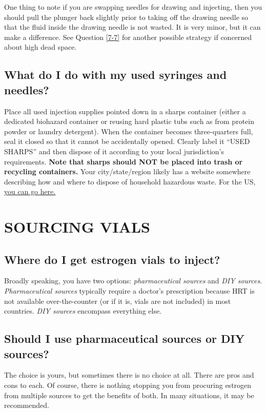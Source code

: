 \documentclass{article}
\begin{document}
One thing to note if you are swapping needles for drawing and injecting, then you should pull the plunger back slightly prior to taking off the drawing needle so that the fluid inside the drawing needle is not wasted. It is very minor, but it can make a difference. See Question \ref{7-7} for another possible strategy if concerned about high dead space.

\subsection{What do I do with my used syringes and needles?}\label{5-27}

Place all used injection supplies pointed down in a sharps container (either a dedicated biohazard container or reusing hard plastic tubs such as from protein powder or laundry detergent). When the container becomes three-quarters full, seal it closed so that it cannot be accidentally opened. Clearly label it “USED SHARPS” and then dispose of it according to your local jurisdiction's requirements. \textbf{Note that sharps should NOT be placed into trash or recycling containers.} Your city/state/region likely has a website somewhere describing how and where to dispose of household hazardous waste. For the US, \href{https://safeneedledisposal.org/}{you can go here.}



\section{SOURCING VIALS}\label{sv}

\subsection{Where do I get estrogen vials to inject?}

Broadly speaking, you have two options: \textit{pharmaceutical sources} and \textit{DIY sources}. \textit{Pharmaceutical sources} typically require a doctor's prescription because HRT is not available over-the-counter (or if it is, vials are not included) in most countries. \textit{DIY sources} encompass everything else.

\subsection{Should I use pharmaceutical sources or DIY sources?}

The choice is yours, but sometimes there is no choice at all. There are pros and cons to each. Of course, there is nothing stopping you from procuring estrogen from multiple sources to get the benefits of both. In many situations, it may be recommended.
\end{document}
